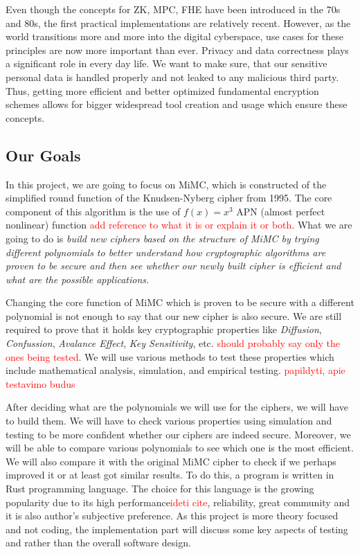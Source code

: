 \documentclass{Resources/UoBLab1}
\theoremstyle{definition}
\begin{document}
Even though the concepts for ZK, MPC, FHE have been introduced in the 70s and 80s, the first practical implementations are relatively recent. However, as the world transitions more and more into the digital cyberspace, use cases for these principles are now more important than ever. Privacy and data correctness plays a significant role in every day life. We want to make sure, that our sensitive personal data is handled properly and not leaked to any malicious third party. Thus, getting more efficient and better optimized fundamental encryption schemes allows for bigger widespread tool creation and usage which ensure these concepts.

\subsection{Our Goals}
In this project, we are going to focus on MiMC, which is constructed of the simplified round function of the Knudsen-Nyberg cipher from 1995\cite{KNCipher}. The core component of this algorithm is the use of \(f(x)=x^3\) APN (almost perfect nonlinear) function \textcolor{red}{add reference to what it is or explain it or both}. What we are going to do is \textit{build new ciphers based on the structure of MiMC by trying different polynomials to better understand how cryptographic algorithms are proven to be secure and then see whether our newly built cipher is efficient and what are the possible applications.}

Changing the core function of MiMC which is proven to be secure with a different polynomial is not enough to say that our new cipher is also secure. We are still required to prove that it holds key cryptographic properties like \textit{Diffusion}, \textit{Confussion}, \textit{Avalance Effect}, \textit{Key Sensitivity}, etc. \textcolor{red}{should probably say only the ones being tested}. We will use various methods to test these properties which include mathematical analysis, simulation, and empirical testing. \textcolor{red}{papildyti, apie testavimo budus}

After deciding what are the polynomials we will use for the ciphers, we will have to build them. We will have to check various properties using simulation and testing to be more confident whether our ciphers are indeed secure. Moreover, we will be able to compare various polynomials to see which one is the most efficient. We will also compare it with the original MiMC cipher to check if we perhaps improved it or at least got similar results. To do this, a program is written in Rust programming language. The choice for this language is the growing popularity due to its high performance\textcolor{red}{ideti cite}, reliability, great community and it is also author's subjective preference. As this project is more theory focused and not coding, the implementation part will discuss some key aspects of testing and rather than the overall software design.
\end{document}
